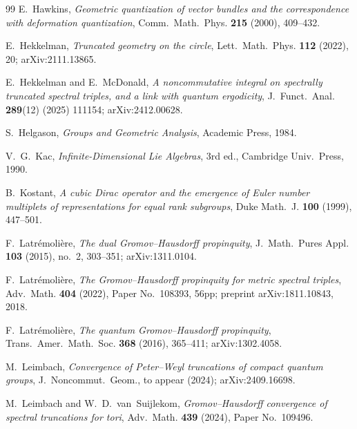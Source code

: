 \documentclass[11pt,a4paper]{article}
\theoremstyle{plain}
\theoremstyle{definition}
\begin{document}
\begin{thebibliography}{99}
E.~Hawkins,
\newblock \emph{Geometric quantization of vector bundles and the
correspondence with deformation quantization},
\newblock Comm.~Math.~Phys. \textbf{215} (2000), 409--432.

E.~Hekkelman,
\newblock \emph{Truncated geometry on the circle},
\newblock Lett.~Math.~Phys. \textbf{112} (2022), 20;
\newblock arXiv:2111.13865.

E.~Hekkelman and E.~McDonald,
\newblock \emph{A noncommutative integral on spectrally truncated
spectral triples, and a link with quantum ergodicity},
\newblock J.~Funct.~Anal. \textbf{289}(12) (2025) 111154;
\newblock arXiv:2412.00628.

S.~Helgason,
\newblock \emph{Groups and Geometric Analysis},
\newblock Academic Press, 1984.

V.~G.~Kac,
\newblock \emph{Infinite-Dimensional Lie Algebras},
\newblock 3rd ed., Cambridge Univ.~Press, 1990.

B.~Kostant,
\newblock \emph{A cubic Dirac operator and the emergence of Euler number
multiplets of representations for equal rank subgroups},
\newblock Duke Math.~J. \textbf{100} (1999), 447--501.

F.~Latr\'emoli\`ere,
\newblock \emph{The dual Gromov--Hausdorff propinquity},
\newblock J.~Math.~Pures Appl. \textbf{103} (2015), no.~2, 303--351;
arXiv:1311.0104.

F.~Latr\'emoli\`ere,
\newblock \emph{The Gromov--Hausdorff propinquity for metric spectral
triples},
\newblock Adv.~Math. \textbf{404} (2022), Paper No.~108393, 56pp;
\newblock preprint arXiv:1811.10843, 2018.

F.~Latr\'emoli\`ere,
\newblock \emph{The quantum Gromov--Hausdorff propinquity},
\newblock Trans.~Amer.~Math.~Soc. \textbf{368} (2016), 365--411;
arXiv:1302.4058.

M.~Leimbach,
\newblock \emph{Convergence of Peter--Weyl truncations of compact quantum
groups},
\newblock J.~Noncommut.~Geom., to appear (2024);
\newblock arXiv:2409.16698.

M.~Leimbach and W.~D.~van~Suijlekom,
\newblock \emph{Gromov--Hausdorff convergence of spectral truncations
for tori},
\newblock Adv.~Math. \textbf{439} (2024), Paper No.~109496.


\end{thebibliography}
\end{document}
